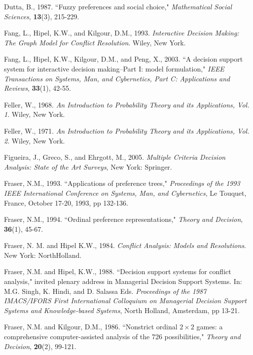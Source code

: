 \documentclass[letterpaper,12pt,titlepage,oneside,final]{book}
\begin{document}
\begin{thebibliography}{}
Dutta, B., 1987. ``Fuzzy preferences and social choice," \emph{Mathematical Social Sciences}, {\bf 13}(3), 215-229.

Fang, L., Hipel, K.W., and Kilgour, D.M., 1993. \emph{Interactive Decision Making: The Graph Model for Conflict Resolution}. Wiley, New York.

Fang, L., Hipel, K.W., Kilgour, D.M., and Peng, X., 2003. ``A decision support system for interactive decision making--Part I: model formulation," \emph{IEEE Transactions on Systems, Man, and Cybernetics, Part C: Applications and Reviews}, {\bf 33}(1), 42-55.

Feller, W., 1968. \emph{An Introduction to Probability Theory and its Applications, Vol. 1}. Wiley, New York.

Feller, W., 1971. \emph{An Introduction to Probability Theory and its Applications, Vol. 2}. Wiley, New York.

Figueira, J., Greco, S., and Ehrgott, M., 2005. \emph{Multiple Criteria Decision Analysis: State of the Art Surveys}, New York: Springer.

Fraser, N.M., 1993. ``Applications of preference trees," \emph{Proceedings of the 1993 IEEE International Conference on Systems, Man, and Cybernetics}, Le Touquet, France, October 17-20, 1993, pp 132-136.

Fraser, N.M., 1994. ``Ordinal preference representations," \emph{Theory and Decision}, {\bf 36}(1), 45-67.

Fraser, N. M. and Hipel K.W., 1984. \emph{Conflict Analysis: Models and Resolutions}. New York: NorthHolland.

Fraser, N.M. and Hipel, K.W., 1988. ``Decision support systems for conflict analysis," invited plenary address in Managerial Decision Support Systems. In: M.G. Singh, K. Hindi, and D. Salassa Eds. \emph{Proceedings of the 1987 IMACS/IFORS First International Colloquium on Managerial Decision Support Systems and Knowledge-based Systems}, North Holland, Amsterdam, pp 13-21.

Fraser, N.M. and Kilgour, D.M., 1986. ``Nonstrict ordinal $2 \times 2$ games: a comprehensive computer-assisted analysis of the 726 possibilities," \emph{Theory and Decision}, {\bf 20}(2), 99-121.


\end{thebibliography}
\end{document}
